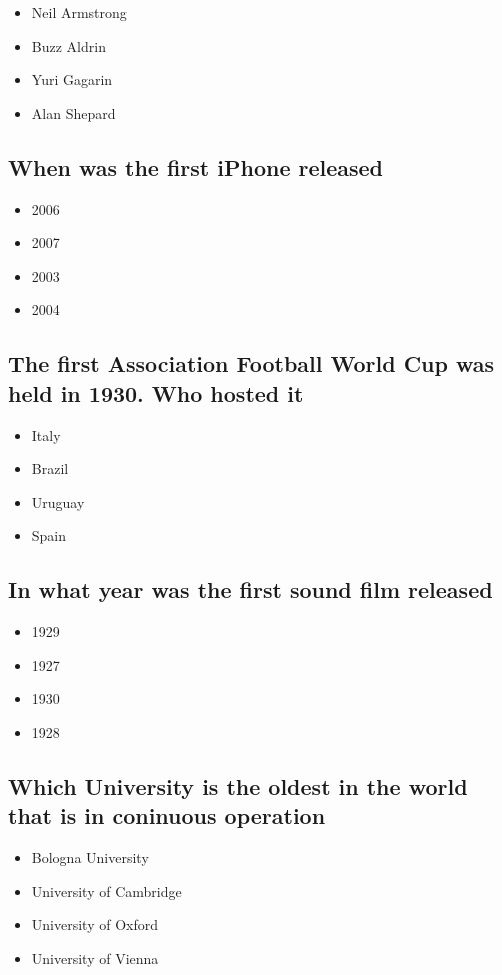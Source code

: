 \documentclass{article}
\begin{document}
\begin{itemize}
\item Neil Armstrong
\item Buzz Aldrin
\item Yuri Gagarin
\item Alan Shepard

\end{itemize}




\subsection{When was the first iPhone released}

\begin{itemize}
\item 2006
\item 2007
\item 2003
\item 2004

\end{itemize}





\subsection{The first Association Football World Cup was held in 1930. Who hosted it}
\begin{itemize}
\item Italy
\item Brazil
\item Uruguay
\item Spain
\end{itemize}

\subsection{In what year was the first sound film released}
\begin{itemize}
\item 1929
\item 1927
\item 1930
\item 1928
\end{itemize}


\subsection{Which University is the oldest in the world that is in coninuous operation}
\begin{itemize}
\item Bologna University
\item University of Cambridge
\item University of Oxford
\item University of Vienna
\end{itemize}
\end{document}
